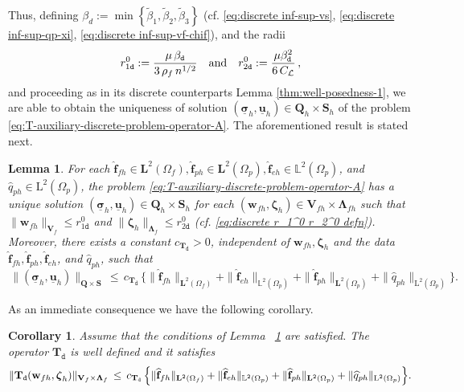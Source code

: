 \documentclass[11pt]{article}
\numberwithin{equation}{section}
\newcommand{\bLambda}{{\boldsymbol\Lambda}}
\newcommand{\bsi}{{\boldsymbol\sigma}}
\newcommand{\bzeta}{{\boldsymbol\zeta}}
\newcommand{\ubsi}{\underline{\bsi}}
\newcommand{\ubu}{\underline{\bu}}
\newcommand{\bw}{{\mathbf{w}}}
\newcommand{\f}{\mathbf{f}}
\newcommand{\bu}{\mathbf{u}}
\newcommand{\0}{{\mathbf{0}}}
\def\bV{\mathbf{V}}
\def\bT{\mathbf{T}}
\def\bQ{\mathbf{Q}}
\def\bS{\mathbf{S}}
\newcommand{\bL}{\mathbf{L}}
\newcommand\bbL{\mathbb{L}}
\newcommand{\cL}{\mathcal{L}}
\def\L{\mathrm{L}}
\def\ttd{\mathtt{d}}
\def\qan{{\quad\hbox{and}\quad}}
\def\wt{\widetilde}
\def\wh{\widehat}
\newtheorem{lem}[thm]{Lemma}
\newtheorem{cor}[thm]{Corollary}
\numberwithin{equation}{section}
\begin{document}
Thus, defining $\beta_{d}:= \min\left\{ \wt{\beta}_1, \wt{\beta}_2, \wt{\beta}_3\right\}$ (cf. \eqref{eq:discrete inf-sup-vs}, \eqref{eq:discrete inf-sup-qp-xi}, \eqref{eq:discrete inf-sup-vf-chif}), 
and the radii
\begin{equation}\label{eq:discrete r_1^0 r_2^0 defn}
r_{1\ttd}^0:= \frac{\mu\,\beta_{\ttd}}{3\,\rho_f\,n^{1/2}} \qan 
r_{2\ttd}^0 := \frac{\mu \beta_{\ttd}^2}{6\,C_{\cL}}\,,
\end{equation}
and proceeding as in its discrete counterparts Lemma \ref{thm:well-posedness-1},
we are able to obtain the uniqueness of solution $(\ubsi_{h},\ubu_{h})\in \bQ_{h}\times \bS_{h}$ of the problem \eqref{eq:T-auxiliary-discrete-problem-operator-A}.
The aforementioned result is stated next.
%
\begin{lem}\label{thm:discrete-well-posedness-1}
For each $\wh{\f}_{fh}\in \bL^2(\Omega_f), \wh{\f}_{ph}\in \bL^2(\Omega_p), \wh{\f}_{eh} \in \bbL^2(\Omega_p)$, and $\wh{q}_{ph}\in \L^2(\Omega_p)$, the problem \eqref{eq:T-auxiliary-discrete-problem-operator-A} has a unique solution $(\ubsi_{h},\ubu_{h})\in \bQ_{h}\times \bS_{h}$ for each $(\bw_{fh},\bzeta_{h})\in \bV_{fh}\times \bLambda_{fh}$ such that $\|\bw_{fh}\|_{\bV_f} \leq r_{1\ttd}^0$ and $\|\bzeta_{h}\|_{\bLambda_f} \leq r_{2\ttd}^0$ (cf. \eqref{eq:discrete r_1^0 r_2^0 defn}).
Moreover, there exists a constant $c_{\bT_{\ttd}} > 0$, independent of $\bw_{fh},\bzeta_{h}$ and the data $\wh{\f}_{fh}, \wh{\f}_{ph}, \wh{\f}_{eh} $, and $\wh{q}_{ph}$, such that
\begin{equation*}%
\, \|(\ubsi_{h}, \ubu_{h})\|_{\bQ\times \bS} 
\,\leq\, {c_{\bT_{\ttd}}\,\Big\{ \|\wh{\f}_{fh}\|_{\bL^2(\Omega_f)} +  \|\wh{\f}_{eh}\|_{\bbL^2(\Omega_p)}+ \|\wh{\f}_{ph}\|_{\bL^2(\Omega_p)} + \| \wh{q}_{ph}\|_{\L^2(\Omega_p)}\Big\}}.
\end{equation*}
\end{lem}
As an immediate consequence we have the following corollary.
\begin{cor}\label{eq:T-discrete-well-delfined}
Assume that the conditions of Lemma ~\ref{thm:discrete-well-posedness-1} are satisfied. The operator $\bT_{\ttd}$ is well defined and it satisfies
\begin{equation*}%
\|\bT_{\tt d}(\bw_{fh},\bzeta_{h})\|_{\bV_f\times \bLambda_f} 
\,\leq\, {c_{\bT_{\tt d}}\,\Big\{ \|\wh{\f}_{fh}\|_{\bL^2(\Omega_f)} +  \|\wh{\f}_{eh}\|_{\bbL^2(\Omega_p)}+ \|\wh{\f}_{ph}\|_{\bL^2(\Omega_p)} + \| \wh{q}_{ph}\|_{\L^2(\Omega_p)} \Big\}}.
\end{equation*}
\end{cor}
\end{document}
